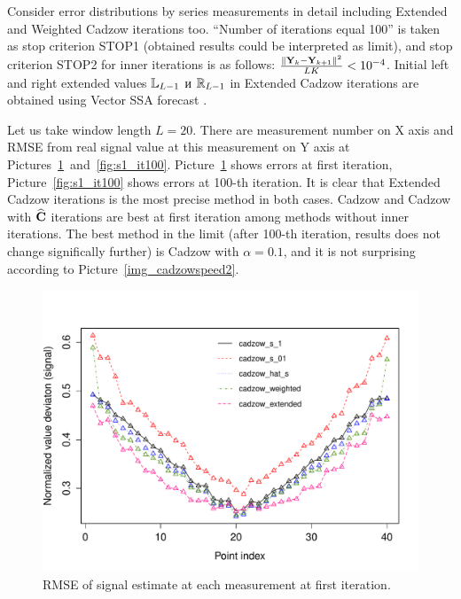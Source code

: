 \documentclass[12pt,a4paper,fleqn,leqno]{article}
\begin{document}
Consider error distributions by series measurements in detail including Extended and Weighted Cadzow iterations too. ``Number of iterations equal 100'' is taken as stop criterion STOP1 (obtained results could be interpreted as limit), and stop criterion STOP2 for inner iterations is as follows:
 $\frac{\|\mathbf{Y}_k - \mathbf{Y}_{k+1}\|^2}{LK} < 10^{-4}$. Initial left and right extended values $\mathbb{L}_{L-1}$ и $\mathbb{R}_{L-1}$ in Extended Cadzow iterations are obtained using Vector SSA forecast \cite[chapter 2.3.1]{Golyandina.etal2001}.

Let us take window length $L=20$. There are measurement number on X axis and RMSE from real signal value at this measurement on Y axis at Pictures~\ref{fig:s1_it1}~and~\ref{fig:s1_it100}. Picture~\ref{fig:s1_it1} shows errors at first iteration, Picture~\ref{fig:s1_it100} shows errors at 100-th iteration. It is clear that Extended Cadzow iterations is the most precise method in both cases. Cadzow and Cadzow with $\widehat{\mathbf{C}}$ iterations are best at first iteration among methods without inner iterations. The best method in the limit (after 100-th iteration, results does not change significally further) is Cadzow with $\alpha=0.1$, and it is not surprising according to Picture~\ref{img_cadzowspeed2}.

\begin{figure}[!hhh]
\begin{center}
\includegraphics[width = 13cm]{s1_it1.pdf}
\caption{RMSE of signal estimate at each measurement at first iteration.}
\label{fig:s1_it1}
\end{center}
\end{figure}
\end{document}

